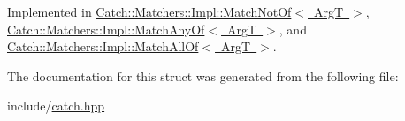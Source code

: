 Implemented in \mbox{\hyperlink{struct_catch_1_1_matchers_1_1_impl_1_1_match_not_of_a1b9ad6566e4ab0f292d2903f557307cc}{Catch\+::\+Matchers\+::\+Impl\+::\+Match\+Not\+Of$<$ Arg\+T $>$}}, \mbox{\hyperlink{struct_catch_1_1_matchers_1_1_impl_1_1_match_any_of_a73be317ecf5919af855af96d68e714b9}{Catch\+::\+Matchers\+::\+Impl\+::\+Match\+Any\+Of$<$ Arg\+T $>$}}, and \mbox{\hyperlink{struct_catch_1_1_matchers_1_1_impl_1_1_match_all_of_a7bf0c2d8cedf67ecf9d0a527cb5a8263}{Catch\+::\+Matchers\+::\+Impl\+::\+Match\+All\+Of$<$ Arg\+T $>$}}.



The documentation for this struct was generated from the following file\+:\begin{DoxyCompactItemize}
\item 
include/\mbox{\hyperlink{catch_8hpp}{catch.\+hpp}}\end{DoxyCompactItemize}
